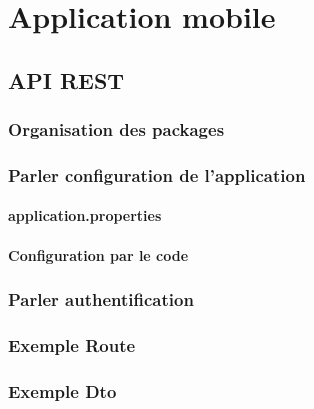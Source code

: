 \chapter{Application mobile}

	\section{API REST}

		\subsection{Organisation des packages}


		\subsection{Parler configuration de l'application}

			\subsubsection{application.properties}


			\subsubsection{Configuration par le code}


		\subsection{Parler authentification}


		\subsection{Exemple Route}


		\subsection{Exemple Dto}


